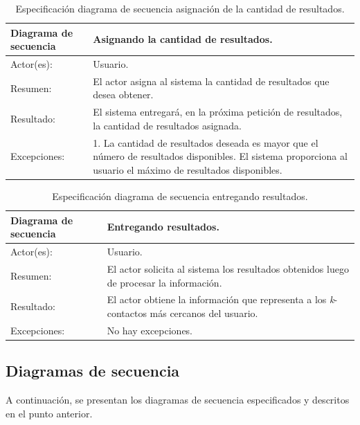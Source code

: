 \begin{table}[H]
\begin{center}
\caption[Especificación diagrama de secuencia asignación de la cantidad de resultados.]{Especificación diagrama de secuencia asignación de la cantidad de resultados.}
\label{tab:des-tab17}
\begin{tabular}{|l|>{\raggedright}p{7cm}|}
\hline 
Diagrama de secuencia & Asignando la cantidad de resultados.\tabularnewline
\hline 
\hline 
Actor(es): & Usuario.\tabularnewline
\hline 
Resumen: & El actor asigna al sistema la cantidad de resultados que desea obtener.\tabularnewline
\hline 
Resultado: & El sistema entregará, en la próxima petición de resultados, la cantidad de resultados asignada.\tabularnewline
\hline 
Excepciones: & 1. La cantidad de resultados deseada es mayor que el número de resultados disponibles. El sistema proporciona al usuario el máximo de resultados disponibles.\tabularnewline
\hline 
\end{tabular}
\end{center}
\end{table}

\begin{table}[H]
\begin{center}
\caption[Especificación diagrama de secuencia entregando resultados.]{Especificación diagrama de secuencia entregando resultados.}
\label{tab:des-tab18}
\begin{tabular}{|l|>{\raggedright}p{7cm}|}
\hline 
Diagrama de secuencia & Entregando resultados.\tabularnewline
\hline 
\hline 
Actor(es): & Usuario.\tabularnewline
\hline 
Resumen: & El actor solicita al sistema los resultados obtenidos luego de procesar la información.\tabularnewline
\hline 
Resultado: & El actor obtiene la información que representa a los \textit{k}-contactos más cercanos del usuario.\tabularnewline
\hline 
Excepciones: & No hay excepciones.\tabularnewline
\hline 
\end{tabular}
\end{center}
\end{table}

\subsection{Diagramas de secuencia}

A continuación, se presentan los diagramas de secuencia especificados y descritos en el punto anterior. 

